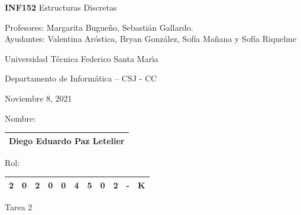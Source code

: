 \documentclass[letterpaper,10pt]{article}
\begin{document}
\thispagestyle{empty}
 	
\begin{minipage}[t]{0.6\textwidth}

{\LARGE \textbf{INF152} Estructuras Discretas}

{\large Profesores: Margarita Bugueño, Sebastián Gallardo.}\\
{\large Ayudantes: Valentina Aróstica, Bryan González, Sofía Mañana y Sofía Riquelme}

Universidad T\'ecnica Federico Santa Mar\'{\i}a

Departamento de Inform\'atica -- CSJ - CC 

Noviembre 8, 2021

\end{minipage}
\hfill
\begin{minipage}[t]{0.3\textwidth}
Nombre:

\begin{tabular}{|c|}\hline
Diego Eduardo Paz Letelier\\\hline
\end{tabular}

\vspace{0.1cm}

Rol:

\begin{tabular}{|c|c|c|c|c|c|c|c|c|c|c|}\hline
2 & 0 & 2 & 0 & 0 & 4 & 5 & 0 & 2 & - & K\\\hline
\end{tabular}
\end{minipage}

\vspace{0.3cm}

\begin{center}
    \huge Tarea 2
\end{center}
\end{document}
